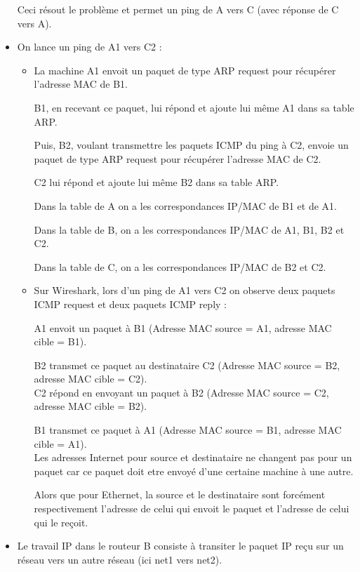 \documentclass{article}
\begin{document}
\begin{itemize}
Ceci résout le problème et permet un ping de A vers C (avec réponse de C vers A).

\item On lance un ping de A1 vers C2 :
	\begin{itemize}
	\item La machine A1 envoit un paquet de type ARP request pour récupérer l'adresse MAC de B1.
	
B1, en recevant ce paquet, lui répond et ajoute lui même A1 dans sa table ARP.

Puis, B2,  voulant transmettre les paquets ICMP du ping à C2, envoie un paquet de type ARP request pour récupérer l'adresse MAC de C2.

C2 lui répond et ajoute lui même B2 dans sa table ARP.

Dans la table de A on a les correspondances IP/MAC de B1 et de A1.

Dans la table de B, on a les correspondances IP/MAC de A1, B1, B2 et C2.

Dans la table de C, on a les correspondances IP/MAC de B2 et C2.

	\item Sur Wireshark, lors d'un ping de A1 vers C2 on observe deux paquets ICMP request et deux paquets ICMP reply :

A1 envoit un paquet à B1 (Adresse MAC source = A1, adresse MAC cible = B1).

B2 transmet ce paquet au destinataire C2 (Adresse MAC source = B2, adresse MAC cible = C2).\\

C2 répond en envoyant un paquet à B2 (Adresse MAC source = C2, adresse MAC cible = B2). 

B1 transmet ce paquet à A1 (Adresse MAC source = B1, adresse MAC cible = A1).\\

Les adresses Internet pour source et destinataire ne changent pas pour un paquet car ce paquet doit etre envoyé d'une certaine machine à une autre.

Alors que pour Ethernet, la source et le destinataire sont forcément respectivement l'adresse de celui qui envoit le paquet et l'adresse de celui qui le reçoit.


	\end{itemize}

\item Le travail IP dans le routeur B consiste à transiter le paquet IP reçu sur un réseau vers un autre réseau (ici net1 vers net2).


\end{itemize}
\end{document}
